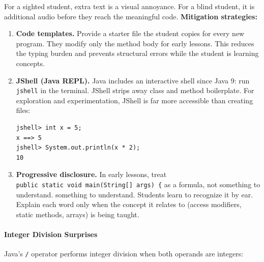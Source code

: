\documentclass[
  justified,
  openright,
]{tufte-book}
\let\subsection\paragraph
\let\paragraph\paragraph
\let\subsection\paragraph
\let\paragraph\paragraph
\begin{document}
For a sighted student, extra text is a visual annoyance. For a blind
student, it is additional audio before they reach the meaningful code.
\textbf{Mitigation strategies:}

\begin{enumerate}
\def\labelenumi{\arabic{enumi}.}
\item
  \textbf{Code templates.} Provide a starter file the student copies for
  every new program. They modify only the method body for early lessons.
  This reduces the typing burden and prevents structural errors while
  the student is learning concepts.
\item
  \textbf{JShell (Java REPL).} Java includes an interactive shell since
  Java 9: run \texttt{jshell} in the terminal. JShell strips away class
  and method boilerplate. For exploration and experimentation, JShell is
  far more accessible than creating files:

\begin{verbatim}
jshell> int x = 5;
x ==> 5
jshell> System.out.println(x * 2);
10
\end{verbatim}
\item
  \textbf{Progressive disclosure.} In early lessons, treat
  \texttt{public\ static\ void\ main(String{[}{]}\ args)\ \{} as a
  formula, not something to understand. something to understand.
Students learn to recognize it
  by ear. Explain each word only when the concept it relates to (access
  modifiers, static methods, arrays) is being taught.
\end{enumerate}

\subsection{Integer Division
Surprises}\label{integer-division-surprises}

Java's \texttt{/} operator performs integer division when both operands
are integers:
\end{document}
